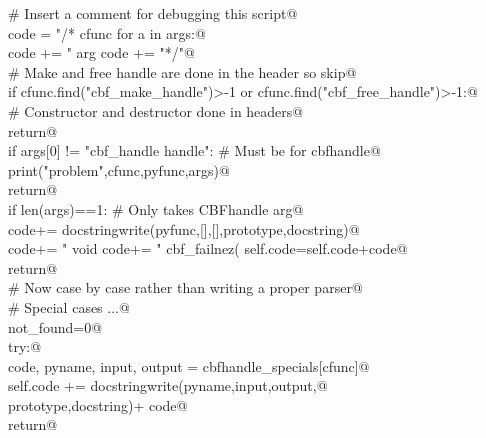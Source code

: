 \documentclass[10pt,a4paper,twoside,notitlepage]{article}
\begin{document}
\begin{flushleft}
\begin{minipage}{\linewidth}
\begin{list}{}{}
\mbox{}\verb@       # Insert a comment for debugging this script@\\
\mbox{}\verb@       code = "\n/* cfunc %s   pyfunc %s  \n"%(cfunc,pyfunc)@\\
\mbox{}\verb@       for a in args:@\\
\mbox{}\verb@          code += "   arg %s "%(a)@\\
\mbox{}\verb@       code += "*/\n\n"@\\
\mbox{}\verb@       # Make and free handle are done in the header so skip@\\
\mbox{}\verb@       if cfunc.find("cbf_make_handle")>-1 or cfunc.find("cbf_free_handle")>-1:@\\
\mbox{}\verb@          # Constructor and destructor done in headers@\\
\mbox{}\verb@          return@\\
\mbox{}\verb@       if args[0] != "cbf_handle handle": # Must be for cbfhandle@\\
\mbox{}\verb@          print("problem",cfunc,pyfunc,args)@\\
\mbox{}\verb@          return@\\
\mbox{}\verb@       if len(args)==1: # Only takes CBFhandle arg@\\
\mbox{}\verb@          code+= docstringwrite(pyfunc,[],[],prototype,docstring)@\\
\mbox{}\verb@          code+= "    void %s(void){\n"%(pyfunc)@\\
\mbox{}\verb@          code+= "      cbf_failnez(%s(self));}\n"%(cfunc) @\\
\mbox{}\verb@          self.code=self.code+code@\\
\mbox{}\verb@          return@\\
\mbox{}\verb@       # Now case by case rather than writing a proper parser@\\
\mbox{}\verb@       # Special cases ...@\\
\mbox{}\verb@       not_found=0@\\
\mbox{}\verb@       try:@\\
\mbox{}\verb@           code, pyname, input, output = cbfhandle_specials[cfunc]@\\
\mbox{}\verb@           self.code +=  docstringwrite(pyname,input,output,@\\
\mbox{}\verb@                                              prototype,docstring)+ code@\\
\mbox{}\verb@           return@\\

\end{list}
\end{minipage}
\end{flushleft}
\end{document}
